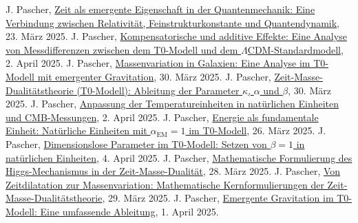 \documentclass[12pt,a4paper]{article}
\newcommand{\alphaEM}{\alpha_{\text{EM}}}
\begin{document}

\begin{thebibliography}{99}
 J. Pascher, \href{https://github.com/jpascher/T0-Time-Mass-Duality/tree/main/2/pdf/Deutsch/ZeitEmergentQM.pdf}{Zeit als emergente Eigenschaft in der Quantenmechanik: Eine Verbindung zwischen Relativität, Feinstrukturkonstante und Quantendynamik}, 23. März 2025.
 J. Pascher, \href{https://github.com/jpascher/T0-Time-Mass-Duality/tree/main/2/pdf/Deutsch/MessdifferenzenT0Standard.pdf}{Kompensatorische und additive Effekte: Eine Analyse von Messdifferenzen zwischen dem T0-Modell und dem $\Lambda$CDM-Standardmodell}, 2. April 2025.
 J. Pascher, \href{https://github.com/jpascher/T0-Time-Mass-Duality/tree/main/2/pdf/Deutsch/MassVarGalaxien.pdf}{Massenvariation in Galaxien: Eine Analyse im T0-Modell mit emergenter Gravitation}, 30. März 2025.
 J. Pascher, \href{https://github.com/jpascher/T0-Time-Mass-Duality/tree/main/2/pdf/Deutsch/ZeitMasseT0Params.pdf}{Zeit-Masse-Dualitätstheorie (T0-Modell): Ableitung der Parameter $\kappa$, $\alpha$ und $\beta$}, 30. März 2025.
 J. Pascher, \href{https://github.com/jpascher/T0-Time-Mass-Duality/tree/main/2/pdf/Deutsch/NatEinheitenAlpha1.pdf}{Anpassung der Temperatureinheiten in natürlichen Einheiten und CMB-Messungen}, 2. April 2025.
 J. Pascher, \href{https://github.com/jpascher/T0-Time-Mass-Duality/tree/main/2/pdf/Deutsch/NatEinheitenAlpha1.pdf}{Energie als fundamentale Einheit: Natürliche Einheiten mit $\alphaEM = 1$ im T0-Modell}, 26. März 2025.
 J. Pascher, \href{https://github.com/jpascher/T0-Time-Mass-Duality/tree/main/2/pdf/Deutsch/Alpha1Beta1Konsistenz.pdf}{Dimensionslose Parameter im T0-Modell: Setzen von $\beta = 1$ in natürlichen Einheiten}, 4. April 2025.
 J. Pascher, \href{https://github.com/jpascher/T0-Time-Mass-Duality/tree/main/2/pdf/Deutsch/MathHiggsZeitMasse.pdf}{Mathematische Formulierung des Higgs-Mechanismus in der Zeit-Masse-Dualität}, 28. März 2025.
 J. Pascher, \href{https://github.com/jpascher/T0-Time-Mass-Duality/tree/main/2/pdf/Deutsch/MathZeitMasseLagrange.pdf}{Von Zeitdilatation zur Massenvariation: Mathematische Kernformulierungen der Zeit-Masse-Dualitätstheorie}, 29. März 2025.
 J. Pascher, \href{https://github.com/jpascher/T0-Time-Mass-Duality/tree/main/2/pdf/Deutsch/EmergentGravT0.pdf}{Emergente Gravitation im T0-Modell: Eine umfassende Ableitung}, 1. April 2025.

\end{thebibliography}
\end{document}
